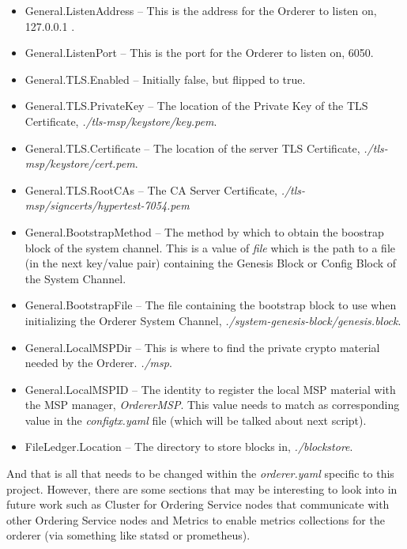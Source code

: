 \begin{itemize}
						\begin{itemize}
							\item General.ListenAddress -- This is the address for the Orderer to listen on, 127.0.0.1 .
							\item General.ListenPort -- This is the port for the Orderer to listen on, 6050.
							\item General.TLS.Enabled -- Initially false, but flipped to true.
							\item General.TLS.PrivateKey -- The location of the Private Key of the TLS Certificate, \textit{./tls-msp/keystore/key.pem}.
							\item General.TLS.Certificate -- The location of the server TLS Certificate, \textit{./tls-msp/keystore/cert.pem}.
							\item General.TLS.RootCAs -- The CA Server Certificate, \textit{./tls-msp/signcerts/hypertest-7054.pem}
							\item General.BootstrapMethod -- The method by which to obtain the boostrap block of the system channel. This is a value of \textit{file} which is the path to a file (in the next key/value pair) containing the Genesis Block or Config Block of the System Channel.
							\item General.BootstrapFile -- The file containing the bootstrap block to use when initializing the Orderer System Channel, \textit{./system-genesis-block/genesis.block}.
							\item General.LocalMSPDir -- This is where to find the private crypto material needed by the Orderer. \textit{./msp}.
							\item General.LocalMSPID -- The identity to register the local MSP material with the MSP manager, \textit{OrdererMSP}. This value needs to match as corresponding value in the \textit{configtx.yaml} file (which will be talked about next script).
							\item FileLedger.Location -- The directory to store blocks in, \textit{./blockstore}.
						\end{itemize}
						
					\hspace{10mm}And that is all that needs to be changed within the \textit{orderer.yaml} specific to this project. However, there are some sections that may be interesting to look into in future work such as Cluster for Ordering Service nodes that communicate with other Ordering Service nodes and Metrics to enable metrics collections for the orderer (via something like statsd or prometheus).
					

\end{itemize}
